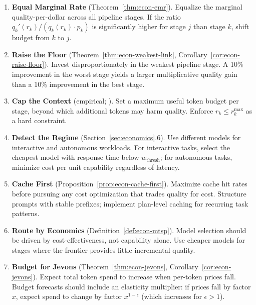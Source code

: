 \begin{enumerate}[label=\textbf{E\arabic*.}, leftmargin=*, nosep]
    \item \textbf{Equal Marginal Rate} (Theorem~\ref{thm:econ-emr}). Equalize the marginal quality-per-dollar across all pipeline stages. If the ratio $q_k'(r_k)/(q_k(r_k) \cdot p_k)$ is significantly higher for stage $j$ than stage $k$, shift budget from $k$ to $j$.

    \item \textbf{Raise the Floor} (Theorem~\ref{thm:econ-weakest-link}, Corollary~\ref{cor:econ-raise-floor}). Invest disproportionately in the weakest pipeline stage. A 10\% improvement in the worst stage yields a larger multiplicative quality gain than a 10\% improvement in the best stage.

    \item \textbf{Cap the Context} (empirical; \citep{gao2025context, liu2024lost, chroma2025rot}). Set a maximum useful token budget per stage, beyond which additional tokens may harm quality. Enforce $r_k \leq r_k^{\max}$ as a hard constraint.

    \item \textbf{Detect the Regime} (Section~\ref{sec:economics}.6). Use different models for interactive and autonomous workloads. For interactive tasks, select the cheapest model with response time below $w_{\text{thresh}}$; for autonomous tasks, minimize cost per unit capability regardless of latency.

    \item \textbf{Cache First} (Proposition~\ref{prop:econ-cache-first}). Maximize cache hit rates before pursuing any cost optimization that trades quality for cost. Structure prompts with stable prefixes; implement plan-level caching for recurring task patterns.

    \item \textbf{Route by Economics} (Definition~\ref{def:econ-mtsp}). Model selection should be driven by cost-effectiveness, not capability alone. Use cheaper models for stages where the frontier provides little incremental quality.

    \item \textbf{Budget for Jevons} (Theorem~\ref{thm:econ-jevons}, Corollary~\ref{cor:econ-jevons}). Expect total token spend to increase when per-token prices fall. Budget forecasts should include an elasticity multiplier: if prices fall by factor $x$, expect spend to change by factor $x^{1-\epsilon}$ (which increases for $\epsilon > 1$).
\end{enumerate}

